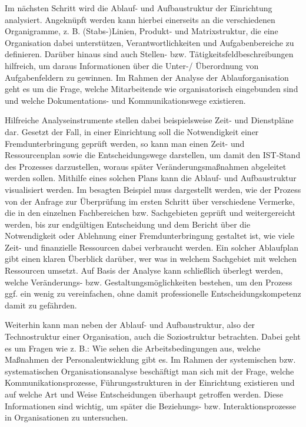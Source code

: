 \documentclass[
  letterpaper,
]{book}
\begin{document}
Im nächsten Schritt wird die Ablauf- und Aufbaustruktur der Einrichtung
analysiert. Angeknüpft werden kann hierbei einerseits an die
verschiedenen Organigramme, z. B. (Stabs-)Linien, Produkt- und
Matrixstruktur, die eine Organisation dabei unterstützen,
Verantwortlichkeiten und Aufgabenbereiche zu definieren. Darüber hinaus
sind auch Stellen- bzw. Tätigkeitsfeldbeschreibungen hilfreich, um
daraus Informationen über die Unter-/ Überordnung von Aufgabenfeldern zu
gewinnen. Im Rahmen der Analyse der Ablauforganisation geht es um die
Frage, welche Mitarbeitende wie organisatorisch eingebunden sind und
welche Dokumentations- und Kommunikationswege existieren.

Hilfreiche Analyseinstrumente stellen dabei beispielsweise Zeit- und
Dienstpläne dar. Gesetzt der Fall, in einer Einrichtung soll die
Notwendigkeit einer Fremdunterbringung geprüft werden, so kann man einen
Zeit- und Ressourcenplan sowie die Entscheidungswege darstellen, um
damit den IST-Stand des Prozesses darzustellen, woraus später
Veränderungsmaßnahmen abgeleitet werden sollen. Mithilfe eines solchen
Plans kann die Ablauf- und Aufbaustruktur visualisiert werden. Im
besagten Beispiel muss dargestellt werden, wie der Prozess von der
Anfrage zur Überprüfung im ersten Schritt über verschiedene Vermerke,
die in den einzelnen Fachbereichen bzw. Sachgebieten geprüft und
weitergereicht werden, bis zur endgültigen Entscheidung und dem Bericht
über die Notwendigkeit oder Ablehnung einer Fremdunterbringung gestaltet
ist, wie viele Zeit- und finanzielle Ressourcen dabei verbraucht werden.
Ein solcher Ablaufplan gibt einen klaren Überblick darüber, wer was in
welchem Sachgebiet mit welchen Ressourcen umsetzt. Auf Basis der Analyse
kann schließlich überlegt werden, welche Veränderungs- bzw.
Gestaltungsmöglichkeiten bestehen, um den Prozess ggf. ein wenig zu
vereinfachen, ohne damit professionelle Entscheidungskompetenz damit zu
gefährden.

Weiterhin kann man neben der Ablauf- und Aufbaustruktur, also der
Technostruktur einer Organisation, auch die Soziostruktur betrachten.
Dabei geht es um Fragen wie z. B.: Wie sehen die Arbeitsbedingungen aus,
welche Maßnahmen der Personalentwicklung gibt es. Im Rahmen der
systemischen bzw. systematischen Organisationsanalyse beschäftigt man
sich mit der Frage, welche Kommunikationsprozesse, Führungsstrukturen in
der Einrichtung existieren und auf welche Art und Weise Entscheidungen
überhaupt getroffen werden. Diese Informationen sind wichtig, um später
die Beziehungs- bzw. Interaktionsprozesse in Organisationen zu
untersuchen.
\end{document}
